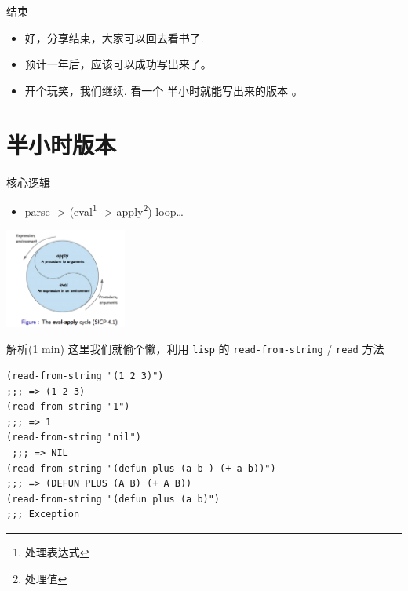 \documentclass[presentation, bigger]{beamer}
\begin{document}
\begin{frame}[label={sec:orgae54002}]{结束}
\begin{itemize}
\item <+-> 好，分享结束，大家可以回去看书了.
\item <2-> 预计一年后，应该可以成功写出来了。
\item <3> 开个玩笑，我们继续. 看一个 \alert{半小时就能写出来的版本} 。
\end{itemize}
\end{frame}

\section{半小时版本}
\label{sec:org83842ef}
\begin{frame}[label={sec:orgdceac76}]{核心逻辑}
\begin{itemize}
\item parse -> (eval\footnote{处理表达式} -> apply\footnote{处理值}) loop\ldots{}
\end{itemize}
\begin{center}
\includegraphics[width=0.3\textwidth]{./img/eval-apply.png}
\end{center}
\end{frame}
\begin{frame}[label={sec:org629dbc5},fragile]{解析(1 min)}
 这里我们就偷个懒，利用 \texttt{lisp} 的 \texttt{read-from-string} / \texttt{read} 方法

\begin{lstlisting}
(read-from-string "(1 2 3)")
;;; => (1 2 3)
(read-from-string "1")
;;; => 1
(read-from-string "nil")
 ;;; => NIL
(read-from-string "(defun plus (a b ) (+ a b))")
;;; => (DEFUN PLUS (A B) (+ A B))
(read-from-string "(defun plus (a b)")
;;; Exception
\end{lstlisting}
\end{frame}
\end{document}
